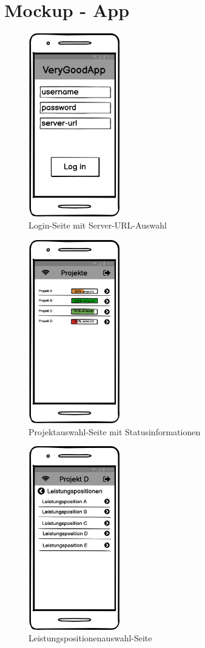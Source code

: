 
\section{Mockup - App}

\begin{figure}[ht]
	\centering
	\includegraphics[width=4cm, height=8cm]{img/mockup-app/Login-screen.png}
	\caption{Login-Seite mit Server-URL-Auswahl}
\end{figure}

\begin{figure}[ht]
	\centering
	\includegraphics[width=4cm, height=8cm]{img/mockup-app/Projekte_Auswahl.png}
	\caption{Projektauswahl-Seite mit Statusinformationen}
\end{figure}

\begin{figure}[ht]
	\centering
	\includegraphics[width=4cm, height=8cm]{img/mockup-app/Leistungspositionen_Auswahl.png}
	\caption{Leistungspositionenauswahl-Seite}
\end{figure}

